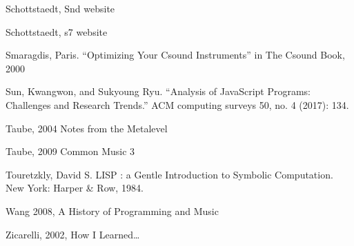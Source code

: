 \documentclass[letterpaper,10pt,english]{sphinxmanual}
\begin{document}
\sphinxAtStartPar
Schottstaedt, Snd website

\sphinxAtStartPar
Schottstaedt, s7 website

\sphinxAtStartPar
Smaragdis, Paris. “Optimizing Your Csound Instruments” in The Csound Book, 2000

\sphinxAtStartPar
Sun, Kwangwon, and Sukyoung Ryu. “Analysis of JavaScript Programs: Challenges and Research Trends.” ACM computing surveys 50, no. 4 (2017): 1\textendash{}34.

\sphinxAtStartPar
Taube, 2004 Notes from the Metalevel

\sphinxAtStartPar
Taube, 2009 Common Music 3

\sphinxAtStartPar
Touretzkly, David S. LISP : a Gentle Introduction to Symbolic Computation. New York: Harper \& Row, 1984.

\sphinxAtStartPar
Wang 2008, A History of Programming and Music

\sphinxAtStartPar
Zicarelli, 2002, How I Learned…



\renewcommand{\indexname}{Index}
\printindex
\end{document}
